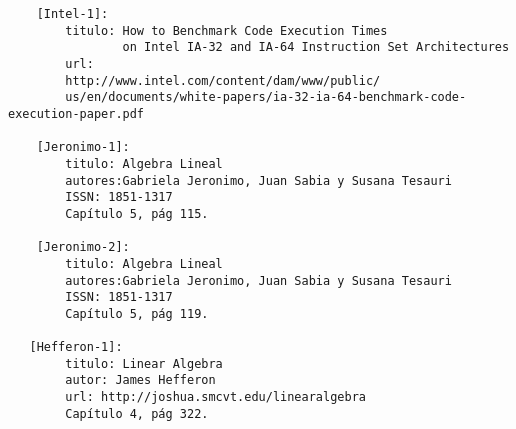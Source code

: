 \begin{verbatim}
    [Intel-1]:
        titulo: How to Benchmark Code Execution Times 
                on Intel IA-32 and IA-64 Instruction Set Architectures
        url: 
        http://www.intel.com/content/dam/www/public/
        us/en/documents/white-papers/ia-32-ia-64-benchmark-code-execution-paper.pdf

    [Jeronimo-1]:
        titulo: Algebra Lineal
        autores:Gabriela Jeronimo, Juan Sabia y Susana Tesauri
        ISSN: 1851-1317
        Capítulo 5, pág 115.

    [Jeronimo-2]:
        titulo: Algebra Lineal
        autores:Gabriela Jeronimo, Juan Sabia y Susana Tesauri
        ISSN: 1851-1317
        Capítulo 5, pág 119.

   [Hefferon-1]:
        titulo: Linear Algebra
        autor: James Hefferon
        url: http://joshua.smcvt.edu/linearalgebra
        Capítulo 4, pág 322.
\end{verbatim}